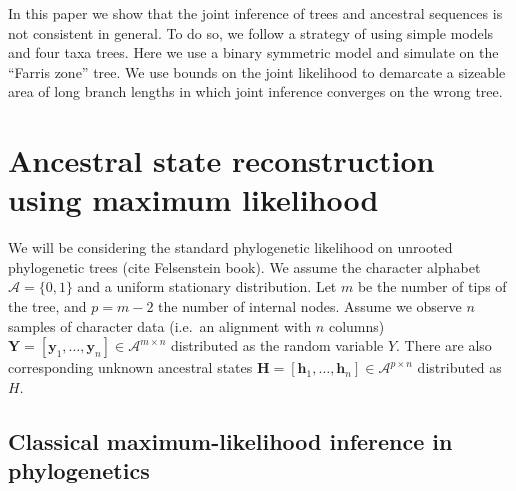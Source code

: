 \documentclass[a4paper]{article}
\newcommand{\alphabet}{\mathcal{A}}
\newcommand{\fullAlignment}{\mathbf{Y}}
\newcommand{\alignmentColumn}{\mathbf{y}}
\newcommand{\alignmentColumnRV}{Y}
\newcommand{\fullAncestralStates}{\mathbf{H}}
\newcommand{\ancestralStateColumn}{\mathbf{h}}
\newcommand{\ancestralStateColumnRV}{H}
\newcommand{\nCols}{n}
\newcommand{\nSiteRows}{m}
\newcommand{\nAncestralStateRows}{p}
\begin{document}
In this paper we show that the joint inference of trees and ancestral sequences is not consistent in general.
To do so, we follow a strategy of using simple models and four taxa trees.
Here we use a binary symmetric model and simulate on the ``Farris zone'' \cite{Siddall1998-hq} tree.
We use bounds on the joint likelihood to demarcate a sizeable area of long branch lengths in which joint inference converges on the wrong tree.

\section{Ancestral state reconstruction using maximum likelihood}

We will be considering the standard phylogenetic likelihood on unrooted phylogenetic trees (cite Felsenstein book).
We assume the character alphabet $\alphabet=\{0,1\}$ and a uniform stationary distribution.
Let $\nSiteRows$ be the number of tips of the tree, and $\nAncestralStateRows = \nSiteRows-2$ the number of internal nodes.
Assume we observe $\nCols$ samples of character data (i.e.\ an alignment with $\nCols$ columns) $\fullAlignment=[\alignmentColumn_1,\ldots,\alignmentColumn_\nCols]\in\alphabet^{\nSiteRows\times\nCols}$ distributed as the random variable $\alignmentColumnRV$.
There are also corresponding unknown ancestral states $\fullAncestralStates=[\ancestralStateColumn_1,\ldots,\ancestralStateColumn_\nCols]\in\alphabet^{\nAncestralStateRows\times\nCols}$ distributed as $\ancestralStateColumnRV$.

\subsection{Classical maximum-likelihood inference in phylogenetics}
\end{document}
